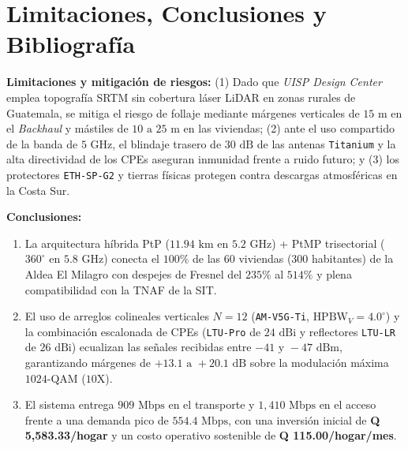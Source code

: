 \documentclass[10pt,letterpaper]{article}
\begin{document}
\section{Limitaciones, Conclusiones y Bibliografía}

\textbf{Limitaciones y mitigación de riesgos:} (1) Dado que \textit{UISP Design Center} emplea topografía SRTM sin cobertura láser LiDAR en zonas rurales de Guatemala, se mitiga el riesgo de follaje mediante márgenes verticales de $15\text{ m}$ en el \textit{Backhaul} y mástiles de $10\text{ a }25\text{ m}$ en las viviendas; (2) ante el uso compartido de la banda de $5\text{ GHz}$, el blindaje trasero de $30\text{ dB}$ de las antenas \texttt{Titanium} y la alta directividad de los CPEs aseguran inmunidad frente a ruido futuro; y (3) los protectores \texttt{ETH-SP-G2} y tierras físicas protegen contra descargas atmosféricas en la Costa Sur.

\textbf{Conclusiones:}
\begin{enumerate}
    \item La arquitectura híbrida PtP ($11.94\text{ km}$ en $5.2\text{ GHz}$) + PtMP trisectorial ($360^\circ$ en $5.8\text{ GHz}$) conecta el $100\%$ de las 60 viviendas (300 habitantes) de la Aldea El Milagro con despejes de Fresnel del $235\%$ al $514\%$ y plena compatibilidad con la TNAF de la SIT.
    \item El uso de arreglos colineales verticales $N=12$ (\texttt{AM-V5G-Ti}, $\text{HPBW}_V = 4.0^\circ$) y la combinación escalonada de CPEs (\texttt{LTU-Pro} de $24\text{ dBi}$ y reflectores \texttt{LTU-LR} de $26\text{ dBi}$) ecualizan las señales recibidas entre $-41\text{ y }-47\text{ dBm}$, garantizando márgenes de $+13.1\text{ a }+20.1\text{ dB}$ sobre la modulación máxima $1024\text{-QAM}$ ($10\text{X}$).
    \item El sistema entrega $909\text{ Mbps}$ en el transporte y $1,410\text{ Mbps}$ en el acceso frente a una demanda pico de $554.4\text{ Mbps}$, con una inversión inicial de \textbf{Q 5,583.33/hogar} y un costo operativo sostenible de \textbf{Q 115.00/hogar/mes}.
\end{enumerate}

\newpage
\end{document}
